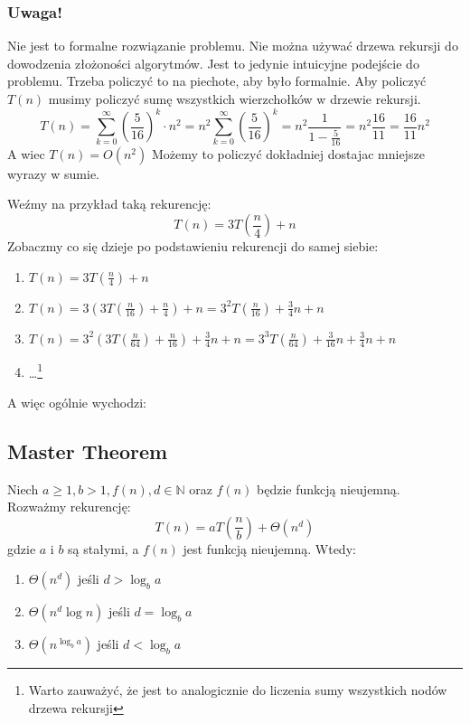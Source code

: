 \documentclass[11pt,a4paper]{article}
\begin{document}
\subsubsection*{Uwaga!}
Nie jest to formalne rozwiązanie problemu. Nie można używać drzewa rekursji do dowodzenia złożoności algorytmów. Jest to jedynie intuicyjne podejście do problemu. Trzeba policzyć to na piechote, aby było formalnie.\newline
Aby policzyć $T(n)$ musimy policzyć sumę wszystkich wierzchołków w drzewie rekursji.
\[
    T(n) = \sum^{\infty}_{k=0} \left(\frac{5}{16}\right)^k \cdot n^2 = n^2 \sum^{\infty}_{k=0} \left(\frac{5}{16}\right)^k = n^2 \frac{1}{1-\frac{5}{16}} = n^2 \frac{16}{11} = \frac{16}{11}n^2
\]
A wiec $T(n) = O(n^2)$
\newline
Możemy to policzyć dokładniej dostajac mniejsze wyrazy w sumie.

Weźmy na przykład taką rekurencję:
\[
    T(n) = 3T(\frac{n}{4}) + n
\]
Zobaczmy co się dzieje po podstawieniu rekurencji do samej siebie:
\begin{enumerate}
    \item $T(n) = 3T(\frac{n}{4}) + n$
    \item $T(n) = 3(3T(\frac{n}{16}) + \frac{n}{4}) + n = 3^2T(\frac{n}{16}) + \frac{3}{4}n + n$
    \item $T(n) = 3^2(3T(\frac{n}{64}) + \frac{n}{16}) + \frac{3}{4}n + n = 3^3T(\frac{n}{64}) + \frac{3}{16}n + \frac{3}{4}n + n$
    \item \dots \footnote{Warto zauważyć, że jest to analogicznie do liczenia sumy wszystkich nodów drzewa rekursji}
\end{enumerate}
A więc ogólnie wychodzi:
\[
\]
\subsection{Master Theorem}
Niech $a \geq 1, b > 1, f(n), d \in \mathbb{N}$ oraz $f(n)$ będzie funkcją nieujemną. Rozważmy rekurencję:
\[
    T(n) = aT(\frac{n}{b}) + \Theta(n^d)
\]
gdzie $a$ i $b$ są stałymi, a $f(n)$ jest funkcją nieujemną. Wtedy:
\begin{enumerate}
    \item $\Theta(n^d)$ jeśli $d > \log_b a$
    \item $\Theta(n^d \log n)$ jeśli $d = \log_b a$
    \item $\Theta(n^{\log_b a})$ jeśli $d < \log_b a$
\end{enumerate}
\end{document}
